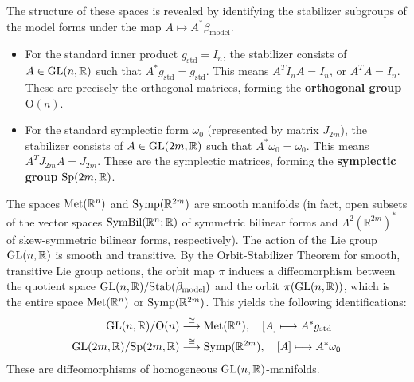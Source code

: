 The structure of these spaces is revealed by identifying the stabilizer subgroups of the model forms under the map $A \mapsto A^* \beta_{\text{model}}$.
\begin{itemize}
    \item For the standard inner product $g_{\text{std}} = I_n$, the stabilizer consists of $A \in \mathrm{GL}(n, \mathbb{R})$ such that $A^* g_{\text{std}} = g_{\text{std}}$. This means $A^T I_n A = I_n$, or $A^T A = I_n$. These are precisely the orthogonal matrices, forming the \textbf{orthogonal group} $\text{O}(n)$.
    \item For the standard symplectic form $\omega_0$ (represented by matrix $J_{2m}$), the stabilizer consists of $A \in \mathrm{GL}(2m, \mathbb{R})$ such that $A^* \omega_0 = \omega_0$. This means $A^T J_{2m} A = J_{2m}$. These are the symplectic matrices, forming the \textbf{symplectic group} $\mathrm{Sp}(2m, \mathbb{R})$. 
\end{itemize}
The spaces $\operatorname{Met}(\mathbb{R}^n)$ and $\operatorname{Symp}(\mathbb{R}^{2m})$ are smooth manifolds (in fact, open subsets of the vector spaces $\operatorname{SymBil}(\mathbb{R}^n; \mathbb{R})$ of symmetric bilinear forms and $\Lambda^2(\mathbb{R}^{2m})^*$ of skew-symmetric bilinear forms, respectively). The action of the Lie group $\mathrm{GL}(n, \mathbb{R})$ is smooth and transitive. By the Orbit-Stabilizer Theorem for smooth, transitive Lie group actions, the orbit map $\pi$ induces a diffeomorphism between the quotient space $\mathrm{GL}(n, \mathbb{R}) / \mathrm{Stab}(\beta_{\text{model}})$ and the orbit $\pi(\mathrm{GL}(n, \mathbb{R}))$, which is the entire space $\operatorname{Met}(\mathbb{R}^n)$ or $\operatorname{Symp}(\mathbb{R}^{2m})$. This yields the following identifications:
\begin{align}
    \mathrm{GL}(n, \mathbb{R}) / \text{O}(n) &\stackrel{\cong}{\longrightarrow} \operatorname{Met}(\mathbb{R}^n), \quad [A] \longmapsto A^* g_{\text{std}} \label{eq:diff_met}\\
    \mathrm{GL}(2m, \mathbb{R}) / \mathrm{Sp}(2m, \mathbb{R}) &\stackrel{\cong}{\longrightarrow} \operatorname{Symp}(\mathbb{R}^{2m}), \quad [A] \longmapsto A^* \omega_0 \label{eq:diff_symp}
\end{align}
These are diffeomorphisms of homogeneous $\mathrm{GL}(n, \mathbb{R})$-manifolds.

